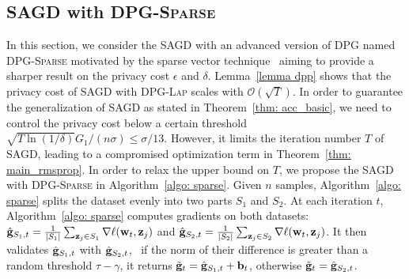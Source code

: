 \documentclass[11pt]{article}
\begin{document}
\subsection{\textsc{SAGD} with \textsc{DPG-Sparse}} \label{subsec: SAGD-sparse}


In this section, we consider the \textsc{SAGD} with an advanced version of \textsc{DPG} named \textsc{DPG-Sparse} motivated by the sparse vector technique~\citep{Article:Dwork_2014} aiming to provide a sharper result on the privacy cost $\epsilon$ and $\delta$.
Lemma~\ref{lemma dpp} shows that the privacy cost of \textsc{SAGD} with \textsc{DPG-Lap} scales with $\mathcal{O}(\sqrt{T})$. In order to guarantee the generalization of \textsc{SAGD} as stated in Theorem~\ref{thm: acc_basic}, we need to control the privacy cost below a certain threshold \ie $\sqrt{T \ln(1/\delta)} G_1/(n\sigma) \leq \sigma/13$. However, it limits the iteration number $T$ of \textsc{SAGD}, leading to a compromised optimization term in Theorem~\ref{thm: main_rmsprop}.  
In order to relax the upper bound on $T$, we propose the \textsc{SAGD} with \textsc{DPG-Sparse} in Algorithm~\ref{algo: sparse}.
Given $n$ samples, Algorithm~\ref{algo: sparse} splits the dataset evenly into two parts $S_1$ and $S_2$. 
At each iteration $t$, Algorithm~\ref{algo: sparse} computes gradients on both datasets:
$\hat {\mathbf{g}}_{S_1,t} = \frac{1}{|S_1|} \sum_{\mathbf{z}_j \in S_1}\nabla \ell(\mathbf{w}_t, \mathbf{z}_j)$ and $\hat {\mathbf{g}}_{S_2,t} = \frac{1}{|S_2|} \sum_{\mathbf{z}_j \in S_2}\nabla \ell(\mathbf{w}_t, \mathbf{z}_j)$.
It then validates $\hat {\mathbf{g}}_{S_1,t} $ with $\hat {\mathbf{g}}_{S_2,t}$, \ie\ if the norm of their difference is greater than a random threshold $\tau-\gamma$, it returns $\tilde {\mathbf{g}}_t = \hat {\mathbf{g}}_{S_1,t} + \mathbf{b}_t$, otherwise $\tilde {\mathbf{g}}_t = \hat {\mathbf{g}}_{S_2,t}$.
\end{document}
